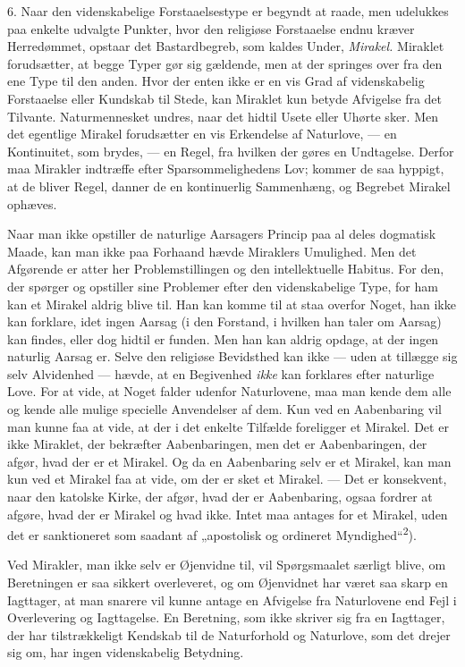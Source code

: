\documentclass[12pt,a4paper,openany]{book}
\newcommand{\opage}[1]{\marginnote{\footnotesize\textit{[#1]}}}
\begin{document}
6. Naar den videnskabelige Forstaaelsestype er begyndt at raade, men
udelukkes paa enkelte udvalgte Punkter, hvor den religiøse Forstaaelse
endnu kræver Herredømmet, opstaar det Bastardbegreb, som kaldes Under,
\textit{Mirakel.} Miraklet forudsætter, at begge Typer gør sig gældende,
men at der springes over fra den ene Type til den anden. Hvor der enten
ikke er en vis Grad af videnskabelig Forstaaelse eller Kundskab til
Stede, kan Miraklet kun betyde Afvigelse fra det Tilvante.
Naturmennesket undres, naar det hidtil Usete eller Uhørte sker. Men det
egentlige Mirakel forudsætter en vis Erkendelse af Naturlove, --- en
Kontinuitet, som brydes, --- en Regel, fra hvilken der gøres en
Undtagelse. Derfor maa Mirakler indtræffe efter Sparsommelighedens Lov;
kommer de saa hyppigt, at de bliver Regel, danner de en kontinuerlig
Sammenhæng, og Begrebet Mirakel ophæves.

Naar man ikke opstiller de naturlige Aarsagers Princip paa al%
\opage{21}deles dogmatisk Maade, kan man ikke paa Forhaand hævde
Miraklers Umulighed. Men det Afgørende er atter her Problemstillingen og
den intellektuelle Habitus. For den, der spørger og opstiller sine
Problemer efter den videnskabelige Type, for ham kan et Mirakel aldrig
blive til. Han kan komme til at staa overfor Noget, han ikke kan
forklare, idet ingen Aarsag (i den Forstand, i hvilken han taler om
Aarsag) kan findes, eller dog hidtil er funden. Men han kan aldrig
opdage, at der ingen naturlig Aarsag er. Selve den religiøse Bevidsthed
kan ikke --- uden at tillægge sig selv Alvidenhed --- hævde, at en
Begivenhed \textit{ikke} kan forklares efter naturlige Love. For at
vide, at Noget falder udenfor Naturlovene, maa man kende dem alle og
kende alle mulige specielle Anvendelser af dem. Kun ved en Aabenbaring
vil man kunne faa at vide, at der i det enkelte Tilfælde foreligger et
Mirakel. Det er ikke Miraklet, der bekræfter Aabenbaringen, men det er
Aabenbaringen, der afgør, hvad der er et Mirakel. Og da en Aabenbaring
selv er et Mirakel, kan man kun ved et Mirakel faa at vide, om der er
sket et Mirakel. --- Det er konsekvent, naar den katolske Kirke, der
afgør, hvad der er Aabenbaring, ogsaa fordrer at afgøre, hvad der er
Mirakel og hvad ikke. Intet maa antages for et Mirakel, uden det er
sanktioneret som saadant af „apostolisk og ordineret
Myndighed“\textsuperscript{2}).

Ved Mirakler, man ikke selv er Øjenvidne til, vil Spørgsmaalet særligt
blive, om Beretningen er saa sikkert overleveret, og om Øjenvidnet har
været saa skarp en Iagttager, at man snarere vil kunne antage en
Afvigelse fra Naturlovene end Fejl i Overlevering og Iagttagelse. En
Beretning, som ikke skriver sig fra en Iagttager, der har tilstrækkeligt
Kendskab til de Naturforhold og Naturlove, som det drejer sig om, har
ingen videnskabelig Betydning.
\end{document}
